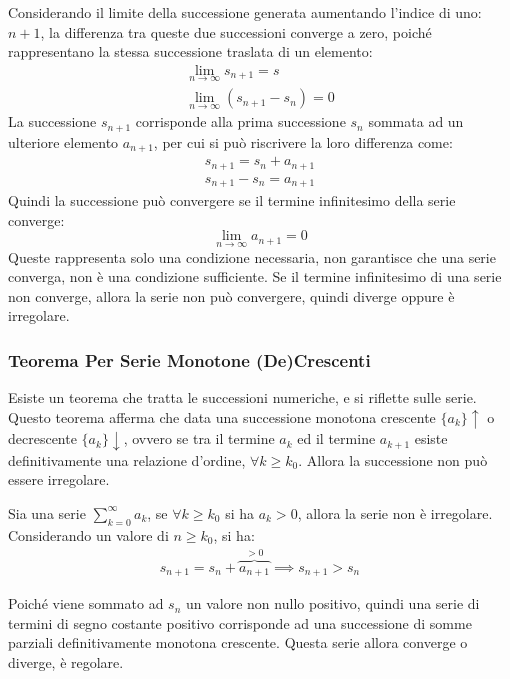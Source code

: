 \documentclass{article}
\numberwithin{equation}{subsection}
\begin{document}
Considerando il limite della successione generata aumentando l'indice di uno: $n+1$, la differenza tra queste due successioni converge a zero, poiché rappresentano la stessa successione traslata di un elemento:
\begin{gather*}
    \lim_{n\to\infty}s_{n+1}=s\\
    \lim_{n\to\infty}(s_{n+1}-s_n)=0
\end{gather*}
La successione $s_{n+1}$ corrisponde alla prima successione $s_n$ sommata ad un ulteriore elemento $a_{n+1}$, per cui si può riscrivere la loro differenza come:
\begin{gather*}
    s_{n+1}=s_n+a_{n+1}\\
    s_{n+1}-s_{n}=a_{n+1}
\end{gather*}
Quindi la successione può convergere se il termine infinitesimo della serie converge:
\begin{equation}
    \lim_{n\to\infty}a_{n+1}=0
\end{equation}
Queste rappresenta solo una condizione necessaria, non garantisce che una serie converga, non è una condizione sufficiente. 
Se il termine infinitesimo di una serie non converge, allora la serie non può convergere, quindi diverge oppure è irregolare. 

\subsubsection{Teorema Per Serie Monotone (De)Crescenti}

Esiste un teorema che tratta le successioni numeriche, e si riflette sulle serie. Questo teorema afferma che data una successione monotona crescente $\{a_k\}\uparrow$ o decrescente $\{a_k\}\downarrow$, ovvero se tra il termine $a_k$ ed il termine $a_{k+1}$ esiste definitivamente una relazione d'ordine, $\forall k\geq k_0$. Allora la successione non può essere irregolare. 

Sia una serie $\sum_{k=0}^\infty a_k$, se $\forall k\geq k_0$ si ha $a_k>0$, allora la serie non è irregolare. Considerando un valore di $n\geq k_0$, si ha:
\begin{gather*}
    s_{n+1}=s_n+\overbrace{a_{n+1}}^{>0}\implies s_{n+1}>s_n
\end{gather*}

Poiché viene sommato ad $s_n$ un valore non nullo positivo, quindi una serie di termini di segno costante positivo corrisponde ad una successione di somme parziali definitivamente monotona crescente. Questa serie allora converge o diverge, è regolare. 
\end{document}
